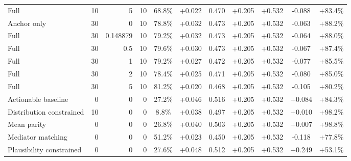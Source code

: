 \begin{table}[htbp]
\begin{tabular}{lrrrccccccc}
Full & 10 & 5 & 10 & 68.8\% & +0.022 & 0.470 & +0.205 & +0.532 & -0.088 & +83.4\% \\
Anchor only & 30 & 0 & 10 & 78.8\% & +0.032 & 0.473 & +0.205 & +0.532 & -0.063 & +88.2\% \\
Full & 30 & 0.148879 & 10 & 79.2\% & +0.032 & 0.473 & +0.205 & +0.532 & -0.064 & +88.0\% \\
Full & 30 & 0.5 & 10 & 79.6\% & +0.030 & 0.473 & +0.205 & +0.532 & -0.067 & +87.4\% \\
Full & 30 & 1 & 10 & 79.2\% & +0.027 & 0.472 & +0.205 & +0.532 & -0.077 & +85.5\% \\
Full & 30 & 2 & 10 & 78.4\% & +0.025 & 0.471 & +0.205 & +0.532 & -0.080 & +85.0\% \\
Full & 30 & 5 & 10 & 81.2\% & +0.020 & 0.468 & +0.205 & +0.532 & -0.105 & +80.2\% \\
Actionable baseline & 0 & 0 & 0 & 27.2\% & +0.046 & 0.516 & +0.205 & +0.532 & +0.084 & +84.3\% \\
Distribution constrained & 10 & 0 & 0 & 8.8\% & +0.038 & 0.497 & +0.205 & +0.532 & +0.010 & +98.2\% \\
Mean parity & 0 & 0 & 0 & 26.8\% & +0.040 & 0.503 & +0.205 & +0.532 & +0.007 & +98.8\% \\
Mediator matching & 0 & 0 & 0 & 51.2\% & +0.023 & 0.450 & +0.205 & +0.532 & -0.118 & +77.8\% \\
Plausibility constrained & 0 & 0 & 0 & 27.6\% & +0.048 & 0.512 & +0.205 & +0.532 & +0.249 & +53.1\% \\
\bottomrule
\end{tabular}
\end{table}